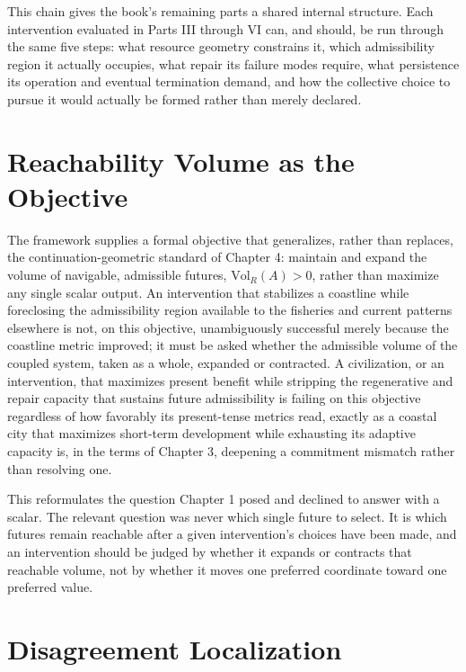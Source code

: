 \documentclass[11pt,oneside]{book}
\begin{document}
This chain gives the book's remaining parts a shared internal structure. Each intervention evaluated in Parts III through VI can, and should, be run through the same five steps: what resource geometry constrains it, which admissibility region it actually occupies, what repair its failure modes require, what persistence its operation and eventual termination demand, and how the collective choice to pursue it would actually be formed rather than merely declared.

\section*{Reachability Volume as the Objective}

The framework supplies a formal objective that generalizes, rather than replaces, the continuation-geometric standard of Chapter 4: maintain and expand the volume of navigable, admissible futures, $\mathrm{Vol}_R(A) > 0$, rather than maximize any single scalar output. An intervention that stabilizes a coastline while foreclosing the admissibility region available to the fisheries and current patterns elsewhere is not, on this objective, unambiguously successful merely because the coastline metric improved; it must be asked whether the admissible volume of the coupled system, taken as a whole, expanded or contracted. A civilization, or an intervention, that maximizes present benefit while stripping the regenerative and repair capacity that sustains future admissibility is failing on this objective regardless of how favorably its present-tense metrics read, exactly as a coastal city that maximizes short-term development while exhausting its adaptive capacity is, in the terms of Chapter 3, deepening a commitment mismatch rather than resolving one.

This reformulates the question Chapter 1 posed and declined to answer with a scalar. The relevant question was never which single future to select. It is which futures remain reachable after a given intervention's choices have been made, and an intervention should be judged by whether it expands or contracts that reachable volume, not by whether it moves one preferred coordinate toward one preferred value.

\section*{Disagreement Localization}
\end{document}

